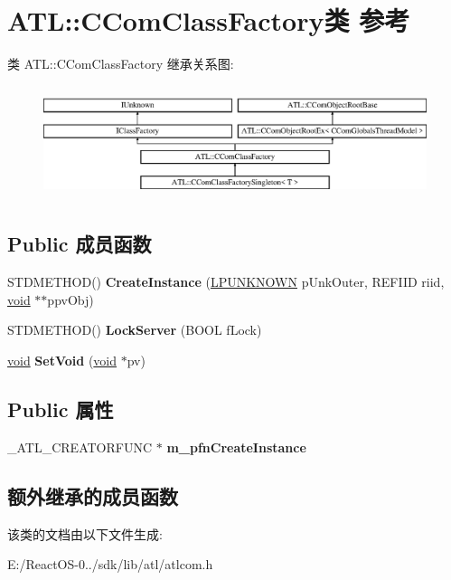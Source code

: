 \hypertarget{class_a_t_l_1_1_c_com_class_factory}{}\section{A\+TL\+:\+:C\+Com\+Class\+Factory类 参考}
\label{class_a_t_l_1_1_c_com_class_factory}
类 A\+TL\+:\+:C\+Com\+Class\+Factory 继承关系图\+:\begin{figure}[H]
\begin{center}
\leavevmode
\includegraphics[height=3.353293cm]{class_a_t_l_1_1_c_com_class_factory}
\end{center}
\end{figure}
\subsection*{Public 成员函数}
\begin{DoxyCompactItemize}
\item 
\mbox{\label{class_a_t_l_1_1_c_com_class_factory_a129531a7355393ec47d525364cd19496}} 
S\+T\+D\+M\+E\+T\+H\+OD() {\bfseries Create\+Instance} (\hyperlink{interface_i_unknown}{L\+P\+U\+N\+K\+N\+O\+WN} p\+Unk\+Outer, R\+E\+F\+I\+ID riid, \hyperlink{interfacevoid}{void} $\ast$$\ast$ppv\+Obj)
\item 
\mbox{\label{class_a_t_l_1_1_c_com_class_factory_a4913483dc9d4c889252ed16ba9ed65f7}} 
S\+T\+D\+M\+E\+T\+H\+OD() {\bfseries Lock\+Server} (B\+O\+OL f\+Lock)
\item 
\mbox{\label{class_a_t_l_1_1_c_com_class_factory_ad6231d76d69ee486d45a24ff81e337b0}} 
\hyperlink{interfacevoid}{void} {\bfseries Set\+Void} (\hyperlink{interfacevoid}{void} $\ast$pv)
\end{DoxyCompactItemize}
\subsection*{Public 属性}
\begin{DoxyCompactItemize}
\item 
\mbox{\label{class_a_t_l_1_1_c_com_class_factory_a8740c14b044a99229e00a6d72fbad881}} 
\+\_\+\+A\+T\+L\+\_\+\+C\+R\+E\+A\+T\+O\+R\+F\+U\+NC $\ast$ {\bfseries m\+\_\+pfn\+Create\+Instance}
\end{DoxyCompactItemize}
\subsection*{额外继承的成员函数}


该类的文档由以下文件生成\+:\begin{DoxyCompactItemize}
\item 
E\+:/\+React\+O\+S-\/0../sdk/lib/atl/atlcom.\+h\end{DoxyCompactItemize}
